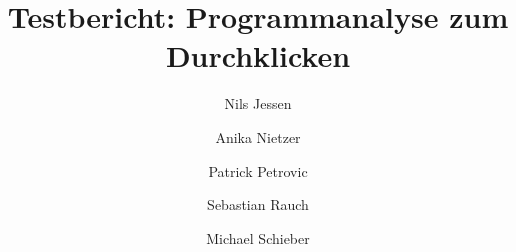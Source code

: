\documentclass[parskip=full,11pt]{scrartcl}
\begin{document}
	\title{Testbericht: Programmanalyse zum Durchklicken}
	\author{Nils Jessen \and Anika Nietzer \and Patrick Petrovic \and Sebastian Rauch \and Michael Schieber}
	
	\maketitle
	
	\newpage
	\tableofcontents

    
	
	
	
\end{document}
